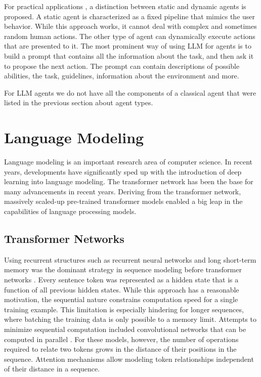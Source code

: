 \documentclass[../main.tex]{subfiles}
\begin{document}
For practical applications \autocite{Zhu2024}, a distinction between static and dynamic agents is proposed.
A static agent is characterized as a fixed pipeline that mimics the user behavior.
While this approach works,
it cannot deal with complex and sometimes random human actions.
The other type of agent can dynamically execute actions that are presented to it.
The most prominent way of using LLM for agents
is to build a prompt that contains all the information about the task,
and then ask it to propose the next action.
The prompt can contain descriptions of possible abilities, the task, guidelines,
information about the environment and more.

For LLM agents we do not have all the components of a classical agent
that were listed in the previous section about agent types.
\autocite{SignificantGravitas2024}

\section{Language Modeling}
\label{sec:language_modeling}
Language modeling is an important research area of computer science.
In recent years, developments have significantly sped up with the introduction of deep learning into language modeling.
The transformer network \cite{Vaswani2017} has been the base for many advancements in recent years.
Deriving from the transformer network,
massively scaled-up pre-trained transformer models \autocite{Brown2020}
enabled a big leap in the capabilities of language processing models.


\subsection{Transformer Networks}
\label{subsec:transformer}

Using recurrent structures such as recurrent neural networks
and long short-term memory \cite{Chung2014}
was the dominant strategy in sequence modeling
before transformer networks \cite{Vaswani2017}.
Every sentence token was represented as a hidden state
that is a function of all previous hidden states.
While this approach has a reasonable motivation,
the sequential nature constrains computation speed for a single training example.
This limitation is especially hindering for longer sequences,
where batching the training data is only possible to a memory limit.
Attempts to minimize sequential computation included convolutional networks
that can be computed in parallel \cite{Gehring2017}.
For these models, however,
the number of operations required to relate two tokens
grows in the distance of their positions in the sequence.
Attention mechanisms allow modeling token relationships
independent of their distance in a sequence.
\end{document}
